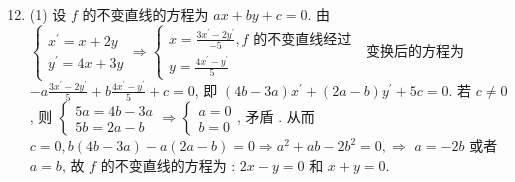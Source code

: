 \documentclass[10pt]{article}
\begin{document}
\begin{enumerate}
  \setcounter{enumi}{11}
  \item (1)  设  $f$  的不变直线的方程为  $a x+b y+c=0 .$  由  $\left\{\begin{array}{l}x^{\prime}=x+2 y \\ y^{\prime}=4 x+3 y\end{array} \Longrightarrow\left\{\begin{array}{l}x=\frac{3 x^{\prime}-2 y^{\prime}}{-5}, f \text { 的不变直线经过 } \\ y=\frac{4 x^{\prime}-y^{\prime}}{5}\end{array}\right.\right.$  变换后的方程为  $-a \frac{3 x^{\prime}-2 y^{\prime}}{5}+b \frac{4 x^{\prime}-y^{\prime}}{5}+c=0$,  即  $(4 b-3 a) x^{\prime}+(2 a-b) y^{\prime}+5 c=0$.  若  $c \neq 0$,  则  $\left\{\begin{array}{l}5 a=4 b-3 a \\ 5 b=2 a-b\end{array} \Longrightarrow\left\{\begin{array}{l}a=0 \\ b=0\end{array}\right.\right.$,  矛盾 .  从而  $c=0, b(4 b-3 a)-a(2 a-b)=0 \Longrightarrow a^{2}+a b-2 b^{2}=0, \Longrightarrow$ $a=-2 b$  或者  $a=b$,  故  $f$  的不变直线的方程为 : $2 x-y=0$  和  $x+y=0$.
\end{enumerate}
\end{document}

